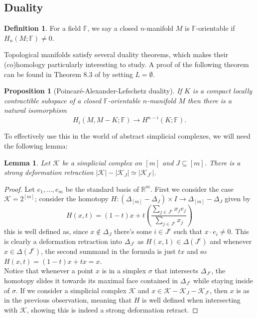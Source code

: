 \documentclass[a4paper]{amsart}
\newtheorem{prop}[thm]{Proposition}
\newtheorem{lem}[thm]{Lemma}
\theoremstyle{definition}
\newtheorem{defin}[thm]{Definition}
\def\K{\mathcal{K}}
\def\R{\mathbb{R}}
\def\F{\mathbb{F}}
\def\J{{J^c}}
\begin{document}
\subsection{Duality}

 \begin{defin}
     For a field $\F$, we say a closed $n$-manifold $M$ is $\F$-orientable if $H_n(M;\F)\neq 0$.
 \end{defin}
 
Topological manifolds satisfy several duality theorems, which makes their (co)homology particularly interesting to study. A proof of the following theorem can be found in Theorem 8.3 of \cite{bredon} by setting $L=\emptyset$. 
\begin{prop}[Poincaré-Alexander-Lefschetz duality]\label{pal}
     If $K$ is a compact locally contractible subspace of a closed $\F$-orientable $n$-manifold $M$ then there is a natural isomorphism \[H_i(M,M-K;\F)\to H^{n-i}(K;\F).\]
\end{prop}

To effectively use this in the world of abstract simplicial complexes, we will need the following lemma:
\begin{lem}\label{simp}
    Let $\K$ be a simplicial complex on $[m]$ and $J\subseteq [m]$. There is a strong deformation retraction $|\K|-|\K_J|\simeq |\K_{{J^c}}|$.
\end{lem}
\begin{proof}
    Let $e_1,\ldots, e_m$ be the standard basis of $\R^m$. First we consider the case $\K=2^{[m]}$; consider the homotopy $H:(\Delta_{[m]}-\Delta_{J})\times I\to \Delta_{[m]}-\Delta_J$ given by 
    \[H(x,t)=(1-t)x+t\left(\frac{\sum\limits_{j\in {J^c}}x_je_j}{\sum\limits_{j\in {J^c}}x_j}\right)\]
    this is well defined as, since $x\notin\Delta_J$ there's some $i\in {J^c}$ such that $x\cdot e_i\neq 0$. This is clearly a deformation retraction into $\Delta_{\J}$ as $H(x,1)\in \Delta({J^c})$ and whenever $x\in \Delta ({J^c})$, the second summand in the formula is just $tx$ and so $H(x,t)=(1-t)x+tx=x$.\\

    Notice that whenever a point $x$ is in a simplex $\sigma$ that intersects $\Delta_{J^c}$, the homotopy slides it towards its maximal face contained in $\Delta_{J^c}$ while staying inside of $\sigma$. If we consider a simplicial complex $\K$ and $x\in \K-\K_J-\K_{J^c}$, then $x$ is as in the previous observation, meaning that $H$ is well defined when intersecting with $\K$, showing this is indeed a strong deformation retract.
\end{proof}
\end{document}
